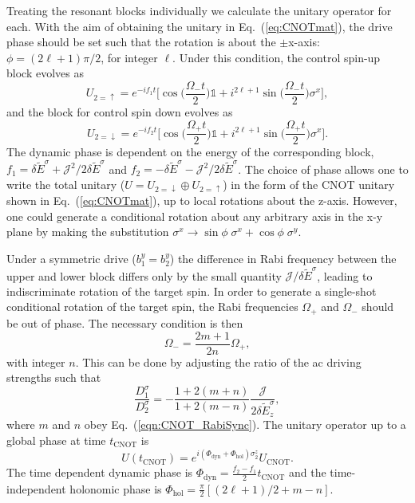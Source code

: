 \documentclass[%
 reprint,
 amsmath,amssymb,
 aps,
prl,
longbibliography
]{revtex4-1}
\begin{document}
Treating the resonant blocks individually we calculate the unitary operator for each. With the aim of obtaining the unitary in Eq.~(\ref{eq:CNOTmat}), the drive phase should be set such that the rotation is about the $\pm$x-axis: $\phi=(2\ell+1)\pi/2$, for integer $\ell$. Under this condition, the control spin-up block evolves as
\begin{equation}\label{eqn:CNOT_unitary2up}
    U_{2=\uparrow}=e^{-i f_1 t}
    \bigg[ \cos\bigg(\frac{\Omega_-t}{2}\bigg)\mathbb{1} + i^{2\ell+1} \sin\bigg(\frac{\Omega_-t}{2}\bigg) \sigma^x\bigg],
\end{equation}
and the block for control spin down evolves as
\begin{equation}\label{eqn:CNOT_unitary2down}
    U_{2=\downarrow}=e^{-i f_2 t}
    \bigg[ \cos\bigg(\frac{\Omega_+t}{2}\bigg)\mathbb{1} + i^{2\ell+1} \sin\bigg(\frac{\Omega_+t}{2}\bigg) \sigma^x\bigg].
\end{equation}
The dynamic phase is dependent on the energy of the corresponding block, $f_1 = \delta \tilde{E}^\sigma + \mathcal{J}^2/2\delta \tilde{E}^\sigma$ and $f_2 =- \delta \tilde{E}^\sigma - \mathcal{J}^2/2\delta \tilde{E}^\sigma$. The choice of phase allows one to write the total unitary ($U=U_{2=\downarrow}\oplus U_{2=\uparrow}$) in the form of the CNOT unitary shown in Eq.~(\ref{eq:CNOTmat}), up to local rotations about the z-axis. However, one could generate a conditional rotation about any arbitrary axis in the x-y plane by making the substitution $\sigma^x\to\sin\phi\;\sigma^x+\cos\phi\;\sigma^y$.


Under a symmetric drive ($b^y_1=b^y_2$) the difference in Rabi frequency between the upper and lower block differs only by the small quantity $\mathcal{J}/\delta\tilde{E}^\sigma$, leading to indiscriminate rotation of the target spin. In order to generate a single-shot conditional rotation of the target spin, the Rabi frequencies $\Omega_+$ and $\Omega_-$ should be out of phase. The necessary condition is then
\begin{equation}\label{eqn:CNOT_RabiSync}
    \Omega_-=\frac{2m+1}{2n}\Omega_+,
\end{equation}
with integer $n$. This can be done by adjusting the ratio of the ac driving strengths such that
\begin{equation}\label{eqn:SyncCond}
    \frac{D^\sigma_{1}}{D^\sigma_{2}}=-\frac{1+2(m+n)}{1+2(m-n)}\frac{\mathcal{J}}{2 \delta \tilde{E}^\sigma_z},
\end{equation}
where $m$ and $n$ obey Eq.~(\ref{eqn:CNOT_RabiSync}). The unitary operator up to a global phase at time $t_\text{CNOT}$ is
\begin{equation}
    U(t_\text{CNOT})=e^{i(\Phi_\text{dyn} + \Phi_\text{hol}) \sigma^z_2}U_\text{CNOT}.
\end{equation}
The time dependent dynamic phase is $\Phi_\text{dyn}=\frac{f_2-f_1}{2}t_\text{CNOT}$ and the time-independent holonomic phase is $\Phi_\text{hol}=\frac{\pi}{2}[(2\ell+1)/2+m-n]$.
\end{document}
